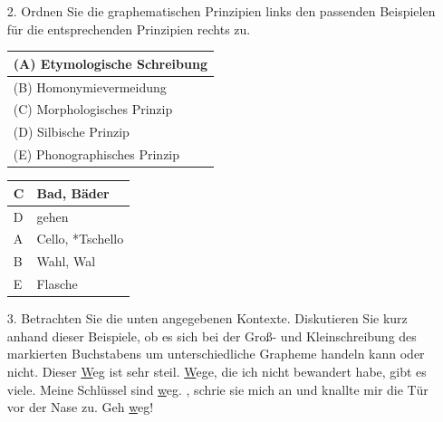 {	\begin{frame}
		\begin{itemize}
			\item[2.] Ordnen Sie die graphematischen Prinzipien links den passenden Beispielen für die entsprechenden Prinzipien rechts zu.
			\begin{table}[h!]
				\begin{minipage}{0.45\textwidth}
					\centering
					\begin{tabular}{|l|}
						\hline
						(A) Etymologische Schreibung\\
						\hline
						(B) Homonymievermeidung\\
						\hline
						(C) Morphologisches Prinzip\\
						\hline
						(D) Silbische Prinzip\\
						\hline
						(E) Phonographisches Prinzip\\
						\hline
					\end{tabular}
				\end{minipage}\hfill%
				\begin{minipage}{0.45\textwidth}
					\centering
					\begin{tabular}{|p{}|l|}
						\hline
						C & Bad, Bäder \\
						\hline
						D & gehen \\
						\hline
						A & Cello, *Tschello \\
						\hline
						B & Wahl, Wal\\
						\hline
						E & Flasche \\
						\hline
					\end{tabular}
				\end{minipage}
			\end{table}
		\end{itemize}
	\end{frame}
	
	\begin{frame}[allowframebreaks]
		\begin{itemize}
			\item[3.] Betrachten Sie die unten angegebenen Kontexte. Diskutieren Sie kurz anhand dieser Beispiele, ob es sich bei der Groß- und Kleinschreibung des markierten Buchstabens um unterschiedliche Grapheme handeln kann oder nicht.
			\eal
			\ex Dieser \underline{W}eg ist sehr steil.
			\ex \underline{W}ege, die ich nicht bewandert habe, gibt es viele.
			\ex Meine Schlüssel sind \underline{w}eg.
			\ex {}, schrie sie mich an und knallte mir die Tür vor der Nase zu.
			\ex Geh \underline{w}eg!
			\zl
			


\end{itemize}
\end{frame}}
